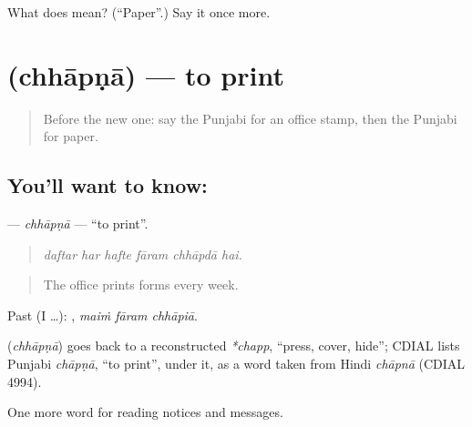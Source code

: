 \begin{tcolorbox}[breakable,colback=teal!4,colframe=teal!35!black,title={Before you move on}]
What does  mean? (\textquotedblleft{}Paper\textquotedblright{}.) Say it once more.
\end{tcolorbox}
\section[\texorpdfstring{\pa{ਛਾਪਣਾ} (chhāpṇā)}{ਛਾਪਣਾ (chhāpṇā)}]{ (chhāpṇā) — to print}

\label{lesson:PA-C255-chhapna}



\begin{quote}
Before the new one: say the Punjabi for an office stamp, then the Punjabi for paper.
\end{quote}

\subsection*{You'll want to know: }
\textbf{} — \emph{chhāpṇā} — \textquotedblleft{}to print\textquotedblright{}.

\begin{quote}
     
\end{quote}

\begin{quote}
\emph{daftar har hafte fāram chhāpdā hai.}
\end{quote}

\begin{quote}
The office prints forms every week.
\end{quote}

Past (I …):   , \emph{maiṁ fāram chhāpiā}.

\begin{cousinweb}
\textbf{} (\emph{chhāpṇā}) goes back to a reconstructed \emph{*chapp}, \textquotedblleft{}press, cover, hide\textquotedblright{}; CDIAL lists Punjabi \emph{chāpṇā}, \textquotedblleft{}to print\textquotedblright{}, under it, as a word taken from Hindi \emph{chāpnā} (CDIAL 4994).
\end{cousinweb}

\begin{grammarlens}[title={What you've built}]
One more word for reading notices and messages.
\end{grammarlens}

